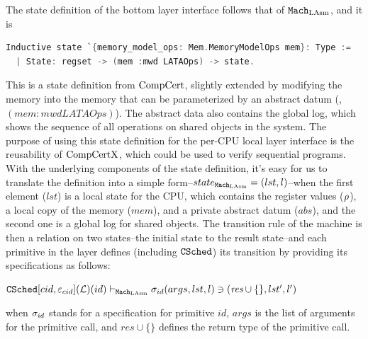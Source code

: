 The state definition of the bottom layer interface follows that of ${\mathrm{\texttt{Mach}}}_{\mathrm{LAsm}}$, and it is
\begin{lstlisting}[language=C]
Inductive state `{memory_model_ops: Mem.MemoryModelOps mem}: Type :=
  | State: regset -> (mem :mwd LATAOps) -> state.
\end{lstlisting}
This  is a state definition from $\mathrm{CompCert}$, slightly extended by modifying the memory 
into the memory that can be parameterized by an abstract datum (\ie, $(mem :mwd LATAOps)$).
The abstract data also contains the global log, which shows the sequence of all operations on shared objects in the system. 
The purpose of using this state definition for the per-CPU local layer interface is the reusability of $\mathrm{CompCertX}$, which could be used to verify sequential programs. 
With the underlying components of the state definition, 
it's easy for us to translate the definition into a simple form--$state_{{\mathrm{\texttt{Mach}}}_{\mathrm{LAsm}}} = (lst, l)$--when the first element ($lst$) is a local state for the CPU, which contains 
the register values ($\rho$), a local copy of the memory ($mem$), and a private abstract datum ($abs$),
and the second one is a global log for shared objects.
%
The transition rule of the machine is then a relation on two states--the initial state to the result state--and each primitive in the layer defines (including ${{\mathrm{\texttt{CSched}}}}$) its transition by providing its specifications as follows:
\begin{center}
${{\mathrm{\texttt{CSched}}}}[cid, {\varepsilon}_{cid}](\mathcal{L})(id)
 \vdash_{{\mathrm{\texttt{Mach}}}_{\mathrm{LAsm}}}  \sigma_{id}(args, lst, l) \ni (\textit{res}\cup \{\}, lst', l')$
\end{center}
{\noindent}when $\sigma_{id}$ stands for a specification for primitive $id$,
$args$ is the list of arguments for the primitive call, and $\textit{res}\cup \{\}$ defines the 
return type of the primitive call.


